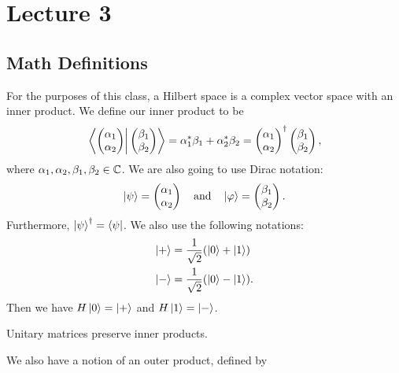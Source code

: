 \documentclass[class=article, crop=false]{standalone}
\begin{document}
  \section{Lecture 3}
  \subsection{Math Definitions}
  For the purposes of this class, a Hilbert space is a complex vector space with an inner product. We define our inner product to be
  \[
    \left.\left\langle \begin{pmatrix}
      \alpha_1 \\
      \alpha_2
    \end{pmatrix}\right\vert \begin{pmatrix}
      \beta_1 \\
      \beta_2
    \end{pmatrix} \right\rangle = \alpha_1^*\beta_1 + \alpha_2^*\beta_2 = \begin{pmatrix}
      \alpha_1 \\
      \alpha_2
    \end{pmatrix}^\dagger \begin{pmatrix}
      \beta_1 \\
      \beta_2
    \end{pmatrix},
  \]
  where $\alpha_1, \alpha_2, \beta_1, \beta_2\in\mathbb{C}$. We are also going to use Dirac notation:
  \[
    \left\lvert \psi \right\rangle = \begin{pmatrix}
      \alpha_1 \\
      \alpha_2
    \end{pmatrix}\quad\text{and}\quad \left\lvert \varphi \right\rangle = \begin{pmatrix}
      \beta_1 \\
      \beta_2
    \end{pmatrix}.
  \]
  Furthermore, $\left\lvert \psi \right\rangle^\dagger = \left\langle \psi \right\rvert$. We also use the following notations:
  \begin{align*}
    \left\lvert + \right\rangle &= \frac{1}{\sqrt{2}}(\left\lvert 0 \right\rangle + \left\lvert 1 \right\rangle) \\
    \left\lvert - \right\rangle &= \frac{1}{\sqrt{2}}(\left\lvert 0 \right\rangle - \left\lvert 1 \right\rangle).
  \end{align*}
  Then we have $H\left\lvert 0 \right\rangle = \left\lvert + \right\rangle$ and $H\left\lvert 1 \right\rangle = \left\lvert - \right\rangle$.
  \begin{note}{}
    Unitary matrices preserve inner products.
  \end{note}
  We also have a notion of an outer product, defined by
\end{document}
